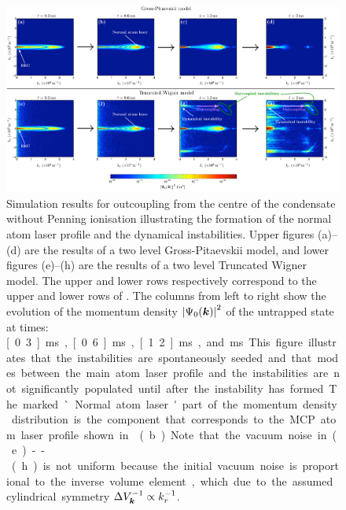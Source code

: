 \begin{figure}
    \centering
    \includegraphics[width=22cm]{ResonantOutcouplingProcess}
    \caption{Simulation results for outcoupling from the centre of the condensate without Penning ionisation illustrating the formation of the normal atom laser profile and the dynamical instabilities. Upper figures (a)--(d) are the results of a two level Gross-Pitaevskii model, and lower figures (e)--(h) are the results of a two level Truncated Wigner model. The upper and lower rows respectively correspond to the upper and lower rows of . The columns from left to right show the evolution of the momentum density $\left|\Psi_0(\bm{k})\right|^2$ of the untrapped state at times: \unit[0.3]{ms}, \unit[0.6]{ms}, \unit[1.2]{ms}, and \unit[2]{ms}.
    This figure illustrates that the instabilities are spontaneously seeded and that modes between the main atom laser profile and the instabilities are not significantly populated until after the instability has formed. The marked `Normal atom laser' part of the momentum density distribution is the component that corresponds to the MCP atom laser profile shown in (b).  Note that the vacuum noise in (e)--(h) is not uniform because the initial vacuum noise is proportional to the inverse volume element, which due to the assumed cylindrical symmetry $\displaystyle \Delta V_{\bm{k}}^{-1} \propto k_r^{-1}$.\label{Peaks:ResonantOutcouplingProcess}}
\end{figure}

